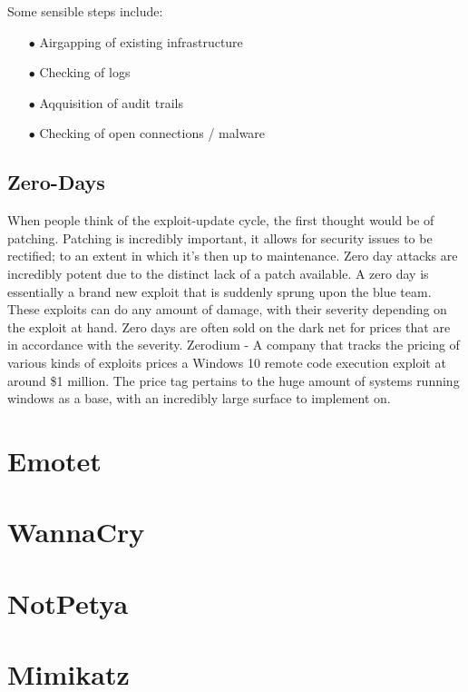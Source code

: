 Some sensible steps include:
\begin{enumerate}
    \item [$\bullet$] Airgapping of existing infrastructure
    \item [$\bullet$] Checking of logs
    \item [$\bullet$] Aqquisition of audit trails
    \item [$\bullet$] Checking of open connections / malware
\end{enumerate}


\subsection{Zero-Days}
When people think of the exploit-update cycle, the first thought would be of patching. Patching is incredibly important, it allows for security issues to be rectified; to an extent in which it's then up to maintenance. Zero day attacks are incredibly 
potent due to the distinct lack of a patch available. A zero day is essentially a brand new exploit that is suddenly sprung upon the blue team. These exploits can do any amount of damage, with their severity depending on the exploit at hand. 
Zero days are often sold on the dark net for prices that are in accordance with the severity. Zerodium - A company that tracks the pricing of various kinds of exploits prices a Windows 10 remote code execution exploit at around \$1 million. 
The price tag pertains to the huge amount of systems running windows as a base, with an incredibly large surface to implement on.


\section{Emotet}
\section{WannaCry}
\section{NotPetya}
\section{Mimikatz}



